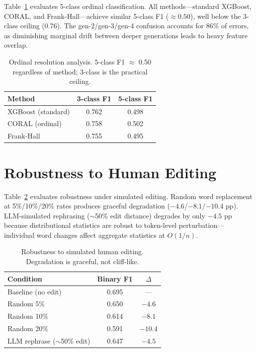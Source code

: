 \documentclass[11pt]{article}
\begin{document}
Table~\ref{tab:ordinal} evaluates 5-class ordinal classification. All methods---standard XGBoost, CORAL, and Frank-Hall---achieve similar 5-class F1 ($\approx 0.50$), well below the 3-class ceiling (0.76). The gen-2/gen-3/gen-4 confusion accounts for 86\% of errors, as diminishing marginal drift between deeper generations leads to heavy feature overlap.

\begin{table}[h]
\centering
\small
\begin{tabular}{lcc}
\toprule
\textbf{Method} & \textbf{3-class F1} & \textbf{5-class F1} \\
\midrule
XGBoost (standard) & 0.762 & 0.498 \\
CORAL (ordinal) & 0.758 & 0.502 \\
Frank-Hall & 0.755 & 0.495 \\
\bottomrule
\end{tabular}
\caption{Ordinal resolution analysis. 5-class F1 $\approx$ 0.50 regardless of method; 3-class is the practical ceiling.}
\label{tab:ordinal}
\end{table}

\section{Robustness to Human Editing}
\label{app:edit}

Table~\ref{tab:edit} evaluates robustness under simulated editing. Random word replacement at 5\%/10\%/20\% rates produces graceful degradation ($-4.6$/$-8.1$/$-10.4$ pp). LLM-simulated rephrasing ($\sim$50\% edit distance) degrades by only $-4.5$ pp because distributional statistics are robust to token-level perturbation---individual word changes affect aggregate statistics at $O(1/n)$.

\begin{table}[h]
\centering
\small
\begin{tabular}{lcc}
\toprule
\textbf{Condition} & \textbf{Binary F1} & \textbf{$\Delta$} \\
\midrule
Baseline (no edit) & 0.695 & --- \\
Random 5\% & 0.650 & $-4.6$ \\
Random 10\% & 0.614 & $-8.1$ \\
Random 20\% & 0.591 & $-10.4$ \\
LLM rephrase ($\sim$50\% edit) & 0.647 & $-4.5$ \\
\bottomrule
\end{tabular}
\caption{Robustness to simulated human editing. Degradation is graceful, not cliff-like.}
\label{tab:edit}
\end{table}
\end{document}
